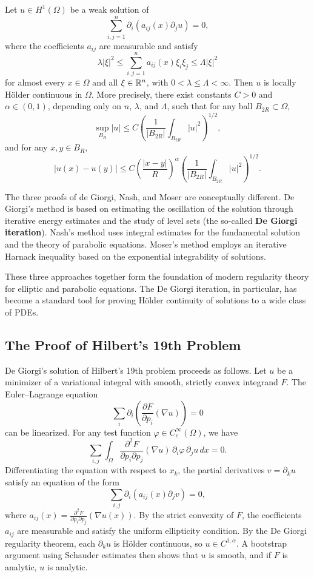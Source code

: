 \begin{theorem}
Let \(u \in H^1(\Omega)\) be a weak solution of
\[
\sum_{i,j=1}^n \partial_i (a_{ij}(x) \partial_j u) = 0,
\]
where the coefficients \(a_{ij}\) are measurable and satisfy
\[
\lambda |\xi|^2 \leq \sum_{i,j=1}^n a_{ij}(x) \xi_i \xi_j \leq \Lambda |\xi|^2
\]
for almost every \(x \in \Omega\) and all \(\xi \in \mathbb{R}^n\), with \(0 < \lambda \leq \Lambda < \infty\). Then \(u\) is locally H\"older continuous in \(\Omega\). More precisely, there exist constants \(C > 0\) and \(\alpha \in (0,1)\), depending only on \(n\), \(\lambda\), and \(\Lambda\), such that for any ball \(B_{2R} \subset \Omega\),
\[
\sup_{B_R} |u| \leq C \left( \frac{1}{|B_{2R}|} \int_{B_{2R}} |u|^2 \right)^{1/2},
\]
and for any \(x,y \in B_R\),
\[
|u(x) - u(y)| \leq C \left( \frac{|x-y|}{R} \right)^\alpha \left( \frac{1}{|B_{2R}|} \int_{B_{2R}} |u|^2 \right)^{1/2}.
\]
\end{theorem}

The three proofs of de Giorgi, Nash, and Moser are conceptually different. De Giorgi's method is based on estimating the oscillation of the solution through iterative energy estimates and the study of level sets (the so-called \textbf{De Giorgi iteration}). Nash's method uses integral estimates for the fundamental solution and the theory of parabolic equations. Moser's method employs an iterative Harnack inequality based on the exponential integrability of solutions.

These three approaches together form the foundation of modern regularity theory for elliptic and parabolic equations. The De Giorgi iteration, in particular, has become a standard tool for proving H\"older continuity of solutions to a wide class of PDEs.

\subsection{The Proof of Hilbert's 19th Problem}

De Giorgi's solution of Hilbert's 19th problem proceeds as follows. Let \(u\) be a minimizer of a variational integral with smooth, strictly convex integrand \(F\). The Euler--Lagrange equation
\[
\sum_i \partial_i \left( \frac{\partial F}{\partial p_i}(\nabla u) \right) = 0
\]
can be linearized. For any test function \(\varphi \in C^\infty_c(\Omega)\), we have
\[
\sum_{i,j} \int_\Omega \frac{\partial^2 F}{\partial p_i \partial p_j}(\nabla u) \, \partial_i \varphi \, \partial_j u \, dx = 0.
\]
Differentiating the equation with respect to \(x_k\), the partial derivatives \(v = \partial_k u\) satisfy an equation of the form
\[
\sum_{i,j} \partial_i (a_{ij}(x) \partial_j v) = 0,
\]
where \(a_{ij}(x) = \frac{\partial^2 F}{\partial p_i \partial p_j}(\nabla u(x))\). By the strict convexity of \(F\), the coefficients \(a_{ij}\) are measurable and satisfy the uniform ellipticity condition. By the De Giorgi regularity theorem, each \(\partial_k u\) is H\"older continuous, so \(u \in C^{1,\alpha}\). A bootstrap argument using Schauder estimates then shows that \(u\) is smooth, and if \(F\) is analytic, \(u\) is analytic.

